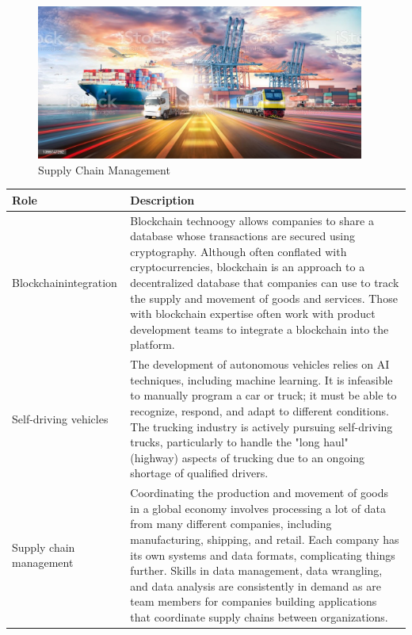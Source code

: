 \begin{figure}[H]
	\begin{center}
		\caption{Supply Chain Management}
		\vskip 4pt
		\includegraphics[height=2in]{images/careers/istockphoto-1399747292-1024x1024.jpg}
	\end{center}
\end{figure}

\begin{table}[H]
	\begin{center}
		\begin{tabular}{p{1in}|p{3.4in}} 
			\textbf{Role} & \textbf{Description}\\
			\hline
			Blockchain\linebreak integration & Blockchain technoogy allows companies to share a database whose transactions are secured using cryptography. Although often conflated with cryptocurrencies, blockchain is an approach to a decentralized database that companies can use to track the supply and movement of goods and services. Those with blockchain expertise often work with product development teams to integrate a blockchain into the platform.\\
			\hline
			Self-driving vehicles & The development of autonomous vehicles relies on AI techniques, including machine learning. It is infeasible to manually program a car or truck; it must be able to recognize, respond, and adapt to different conditions. The trucking industry is actively pursuing self-driving trucks, particularly to handle the "long haul" (highway) aspects of trucking due to an ongoing shortage of qualified drivers.\\
			\hline
			Supply chain management & Coordinating the production and movement of goods in a global economy involves processing a lot of data from many different companies, including manufacturing, shipping, and retail. Each company has its own systems and data formats, complicating things further. Skills in data management, data wrangling, and data analysis are consistently in demand as are team members for companies building applications that coordinate supply chains between organizations.\\
			\hline
		\end{tabular}
	\end{center}
\end{table}

